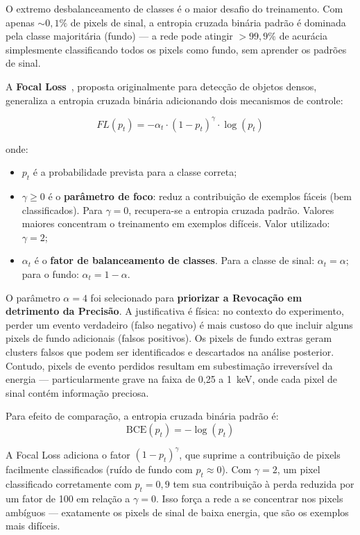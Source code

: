 \documentclass[
       oneside,
       english,
       brazil
       ]{abntbibufjf}
\begin{document}
O extremo desbalanceamento de classes é o maior desafio do treinamento. Com
apenas ${\sim}0{,}1\%$ de pixels de sinal, a entropia cruzada binária padrão
é dominada pela classe majoritária (fundo) — a rede pode atingir
$> 99{,}9\%$ de acurácia simplesmente classificando todos os pixels como
fundo, sem aprender os padrões de sinal.

A \textbf{Focal Loss}~\cite{lin2017focal}, proposta originalmente para
detecção de objetos densos, generaliza a entropia cruzada binária adicionando
dois mecanismos de controle:

\begin{equation}
    FL(p_t) = -\alpha_t \cdot (1 - p_t)^{\gamma} \cdot \log(p_t)
    \label{eq:focal_loss}
\end{equation}

onde:
\begin{itemize}
    \item $p_t$ é a probabilidade prevista para a classe correta;
    \item $\gamma \geq 0$ é o \textbf{parâmetro de foco}: reduz a
    contribuição de exemplos fáceis (bem classificados). Para $\gamma = 0$,
    recupera-se a entropia cruzada padrão. Valores maiores concentram o
    treinamento em exemplos difíceis. Valor utilizado: $\gamma = 2$;
    \item $\alpha_t$ é o \textbf{fator de balanceamento de classes}. Para a
    classe de sinal: $\alpha_t = \alpha$; para o fundo:
    $\alpha_t = 1 - \alpha$.
\end{itemize}

O parâmetro $\alpha = 4$ foi selecionado para \textbf{priorizar a Revocação
em detrimento da Precisão}. A justificativa é física: no contexto do
experimento, perder um evento verdadeiro (falso negativo) é mais custoso do
que incluir alguns pixels de fundo adicionais (falsos positivos). Os pixels
de fundo extras geram clusters falsos que podem ser identificados e
descartados na análise posterior. Contudo, pixels de evento perdidos resultam
em subestimação irreversível da energia — particularmente grave na faixa de
0,25 a 1~keV, onde cada pixel de sinal contém informação preciosa.

Para efeito de comparação, a entropia cruzada binária padrão é:
\begin{equation}
    \text{BCE}(p_t) = -\log(p_t)
    \label{eq:bce}
\end{equation}

A Focal Loss adiciona o fator $(1 - p_t)^\gamma$, que suprime a contribuição
de pixels facilmente classificados (ruído de fundo com $p_t \approx 0$).
Com $\gamma = 2$, um pixel classificado corretamente com $p_t = 0{,}9$ tem
sua contribuição à perda reduzida por um fator de 100 em relação a $\gamma =
0$. Isso força a rede a se concentrar nos pixels ambíguos — exatamente os
pixels de sinal de baixa energia, que são os exemplos mais difíceis.
\end{document}
